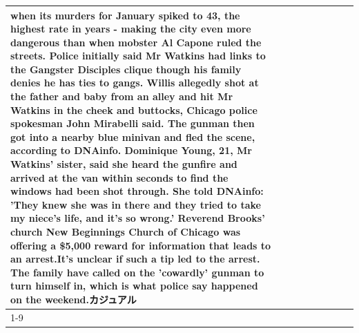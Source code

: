 \begin{table}[H]
\begin{tabular}{lllrlllll}
when its murders for January spiked to 43, the highest rate in years - making the city even more dangerous than when mobster Al Capone ruled the streets. Police initially said Mr Watkins had links to the Gangster Disciples clique though his family denies he has ties to gangs. Willis allegedly shot at the father and baby from an alley and hit Mr Watkins in the cheek and buttocks, Chicago police spokesman John Mirabelli said. The gunman then got into a nearby blue minivan and fled the scene, according to DNAinfo. Dominique Young, 21, Mr Watkins' sister, said she heard the gunfire and arrived at the van within seconds to find the windows had been shot through. She told DNAinfo: 'They knew she was in there and they tried to take my niece's life, and it's so wrong.' Reverend Brooks' church New Beginnings Church of Chicago was offering a \$5,000 reward for information that leads to an arrest.It's unclear if such a tip led to the arrest. The family have called on the 'cowardly' gunman to turn himself in, which is what police say happened on the weekend.カジュアル \\
\cline{1-9}

\end{tabular}
\end{table}
